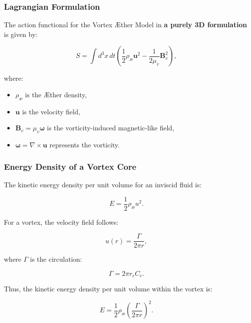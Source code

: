 \subsubsection*{Lagrangian Formulation}
The action functional for the Vortex Æther Model in \textbf{a purely 3D formulation} is given by:

\begin{equation*}
    S = \int d^3x \, dt \left( \frac{1}{2} \rho_{\text{\ae}} \mathbf{u}^2 - \frac{1}{2 \mu_v} \mathbf{B}_v^2 \right),
\end{equation*}

where:
\begin{itemize}
    \item \( \rho_{\text{\ae}} \) is the Æther density,
    \item \( \mathbf{u} \) is the velocity field,
    \item \( \mathbf{B}_v = \mu_v \boldsymbol{\omega} \) is the vorticity-induced magnetic-like field,
    \item \( \boldsymbol{\omega} = \nabla \times \mathbf{u} \) represents the vorticity.
\end{itemize}

\subsubsection*{Energy Density of a Vortex Core}
The kinetic energy density per unit volume for an inviscid fluid is:

\begin{equation*}
    E = \frac{1}{2} \rho_{\text{\ae}} u^2.
\end{equation*}

For a vortex, the velocity field follows:

\begin{equation*}
    u(r) = \frac{\Gamma}{2\pi r},
\end{equation*}

where \( \Gamma \) is the circulation:

\begin{equation*}
    \Gamma = 2\pi r_c C_e.
\end{equation*}

Thus, the kinetic energy density per unit volume within the vortex is:

\begin{equation*}
    E = \frac{1}{2} \rho_{\text{\ae}} \left( \frac{\Gamma}{2\pi r} \right)^2.
\end{equation*}

